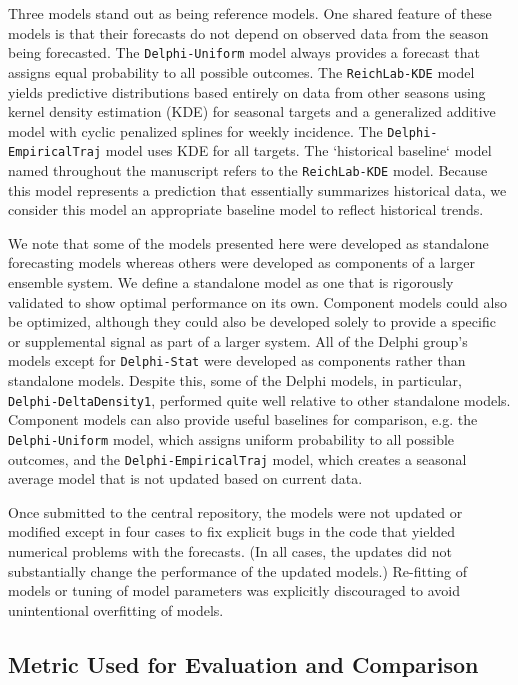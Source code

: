 \documentclass[9pt,twocolumn,twoside]{pnas-new}\usepackage[]{graphicx}\usepackage[]{color}
\begin{document}
{Three models stand out as being reference models. 
One shared feature of these models is that their forecasts do not depend on observed data from the season being forecasted. 
The {\tt Delphi-Uniform} model always provides a forecast that assigns equal probability to all possible outcomes. 
The {\tt ReichLab-KDE} model yields predictive distributions based entirely on data from other seasons using kernel density estimation (KDE) for seasonal targets and a generalized additive model with cyclic penalized splines for weekly incidence.
The {\tt Delphi-EmpiricalTraj} model uses KDE for all targets.
The `historical baseline` model named throughout the manuscript refers to the {\tt ReichLab-KDE} model.
Because this model represents a prediction that essentially summarizes historical data, we consider this model an appropriate baseline model to reflect historical trends.

We note that some of the models presented here were developed as standalone forecasting models whereas others were developed as components of a larger ensemble system. We define a standalone model as one that is rigorously validated to show optimal performance on its own. Component models could also be optimized, although they could also be developed solely to provide a specific or supplemental signal as part of a larger system. All of the Delphi group’s models except for {\tt Delphi-Stat} were developed as components rather than standalone models. Despite this, some of the Delphi models, in particular, {\tt Delphi-DeltaDensity1}, performed quite well relative to other standalone models. Component models can also provide useful baselines for comparison, e.g. the {\tt Delphi-Uniform} model, which assigns uniform probability to all possible outcomes, and the {\tt Delphi-EmpiricalTraj} model, which creates a seasonal average model that is not updated based on current data.

Once submitted to the central repository, the models were not updated or modified except in four cases to fix explicit bugs in the code that yielded numerical problems with the forecasts. 
(In all cases, the updates did not substantially change the performance of the updated models.)
Re-fitting of models or tuning of model parameters was explicitly discouraged to avoid unintentional overfitting of models.

\subsection*{Metric Used for Evaluation and Comparison}

}
\end{document}
